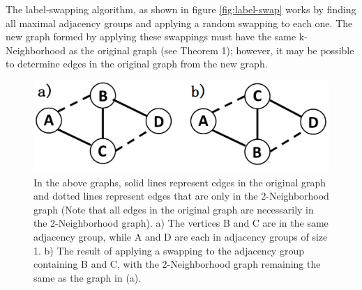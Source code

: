 \indent The label-swapping algorithm, as shown in figure \ref{fig:label-swap} works by finding all maximal adjacency groups and applying a random swapping to each one. The new graph formed by applying these swappings must have the same k-Neighborhood as the original graph (see Theorem 1); however, it may be possible to determine edges in the original graph from the new graph.
\\

\begin{figure}[H]
  \centering
  \includegraphics[scale=0.3 ]{Sample-Graph.png}
  \caption{In the above graphs, solid lines represent edges in the original graph and dotted lines represent edges that are only in the 2-Neighborhood graph (Note that all edges in the original graph are necessarily in the 2-Neighborhood graph). a)  The vertices B and C are in the same adjacency group, while A and D are each in adjacency groups of size 1. b) The result of applying a swapping to the adjacency group containing B and C, with the 2-Neighborhood graph remaining the same as the graph in (a).}
  \label{fig:sample graph}
\end{figure}

